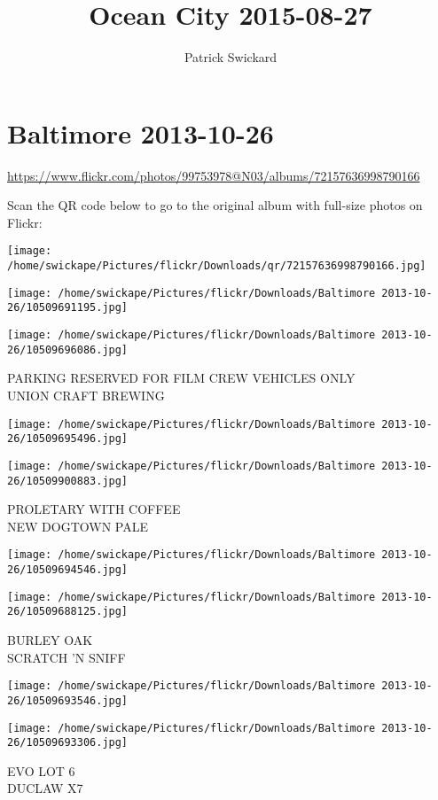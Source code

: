 \documentclass[10pt,letterpaper]{article}
\title{Ocean City 2015-08-27}
\author{Patrick Swickard}
\date{}
\begin{document}
\section*{Baltimore 2013-10-26}

\url{https://www.flickr.com/photos/99753978@N03/albums/72157636998790166}

Scan the QR code below to go to the original album with full-size photos on Flickr:

\texttt{[image: /home/swickape/Pictures/flickr/Downloads/qr/72157636998790166.jpg]}
\pagebreak

\texttt{[image: /home/swickape/Pictures/flickr/Downloads/Baltimore 2013-10-26/10509691195.jpg]}

\vspace{0.25in}
\texttt{[image: /home/swickape/Pictures/flickr/Downloads/Baltimore 2013-10-26/10509696086.jpg]}

PARKING RESERVED FOR FILM CREW VEHICLES ONLY\\
UNION CRAFT BREWING
\pagebreak

\texttt{[image: /home/swickape/Pictures/flickr/Downloads/Baltimore 2013-10-26/10509695496.jpg]}

\vspace{0.25in}
\texttt{[image: /home/swickape/Pictures/flickr/Downloads/Baltimore 2013-10-26/10509900883.jpg]}

PROLETARY WITH COFFEE\\
NEW DOGTOWN PALE
\pagebreak

\texttt{[image: /home/swickape/Pictures/flickr/Downloads/Baltimore 2013-10-26/10509694546.jpg]}

\vspace{0.25in}
\texttt{[image: /home/swickape/Pictures/flickr/Downloads/Baltimore 2013-10-26/10509688125.jpg]}

BURLEY OAK\\
SCRATCH 'N SNIFF
\pagebreak

\texttt{[image: /home/swickape/Pictures/flickr/Downloads/Baltimore 2013-10-26/10509693546.jpg]}

\vspace{0.25in}
\texttt{[image: /home/swickape/Pictures/flickr/Downloads/Baltimore 2013-10-26/10509693306.jpg]}

EVO LOT 6\\
DUCLAW X7
\pagebreak
\end{document}
